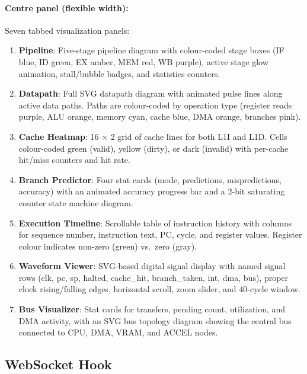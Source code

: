 \documentclass[10pt,a4paper,twoside]{book}
\begin{document}
\paragraph{Centre panel (flexible width):} Seven tabbed visualization
panels:

\begin{enumerate}
    \item \textbf{Pipeline}: Five-stage pipeline diagram with
          colour-coded stage boxes (IF blue, ID green, EX amber, MEM red,
          WB purple), active stage glow animation, stall/bubble badges,
          and statistics counters.
    \item \textbf{Datapath}: Full SVG datapath diagram with animated
          pulse lines along active data paths. Paths are colour-coded by
          operation type (register reads purple, ALU orange, memory cyan,
          cache blue, DMA orange, branches pink).
    \item \textbf{Cache Heatmap}: 16 $\times$ 2 grid of cache lines for
          both L1I and L1D. Cells colour-coded green (valid), yellow
          (dirty), or dark (invalid) with per-cache hit/miss counters
          and hit rate.
    \item \textbf{Branch Predictor}: Four stat cards (mode, predictions,
          mispredictions, accuracy) with an animated accuracy progress
          bar and a 2-bit saturating counter state machine diagram.
    \item \textbf{Execution Timeline}: Scrollable table of instruction
          history with columns for sequence number, instruction text, PC,
          cycle, and register values. Register colour indicates non-zero
          (green) vs.\ zero (gray).
    \item \textbf{Waveform Viewer}: SVG-based digital signal display
          with named signal rows (clk, pc, sp, halted, cache\_hit,
          branch\_taken, int, dma, bus), proper clock rising/falling
          edges, horizontal scroll, zoom slider, and 40-cycle window.
    \item \textbf{Bus Visualizer}: Stat cards for transfers, pending
          count, utilization, and DMA activity, with an SVG bus topology
          diagram showing the central bus connected to CPU, DMA, VRAM,
          and ACCEL nodes.
\end{enumerate}

\subsection{WebSocket Hook}
\end{document}
